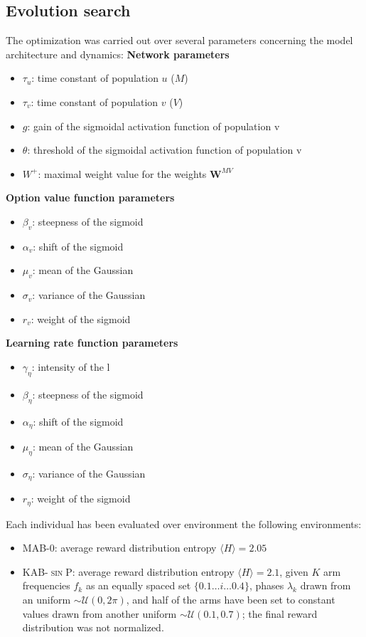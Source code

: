 \subsection{Evolution search}
The optimization was carried out over several parameters concerning the model architecture and dynamics:
\textbf{Network parameters}
\begin{itemize}
    \item $\tau_{u}$: time constant of population $u$ ($M$)
    \item $\tau_{v}$: time constant of population $v$ ($V$)
    \item $g$: gain of the sigmoidal activation function of population v
    \item $\theta$: threshold of the sigmoidal activation function of population v
    \item $W^{+}$: maximal weight value for the weights $\textbf{W}^{MV}$
\end{itemize}

\noindent \textbf{Option value function parameters}
\begin{itemize}
    \item $\beta_{v}$: steepness of the sigmoid
    \item $\alpha_{v}$: shift of the sigmoid
    \item $\mu_{v}$: mean of the Gaussian
    \item $\sigma_{v}$: variance of the Gaussian
    \item $r_{v}$: weight of the sigmoid
\end{itemize}

\noindent \textbf{Learning rate function parameters}
\begin{itemize}
    \item $\gamma_{\eta}$: intensity of the l
    \item $\beta_{\eta}$: steepness of the sigmoid
    \item $\alpha_{\eta}$: shift of the sigmoid
    \item $\mu_{\eta}$: mean of the Gaussian
    \item $\sigma_{\eta}$: variance of the Gaussian
    \item $r_{\eta}$: weight of the sigmoid
\end{itemize}

\noindent Each individual has been evaluated over environment the following environments:

\begin{itemize}
    \item \textsc{MAB-0}: average reward distribution entropy $\langle H\rangle=2.05$
    \item \textsc{KAB-$\sin$P}: average reward distribution entropy $\langle H\rangle=2.1$, given $K$ arm frequencies $f_{k}$ as an equally spaced set $\{0.1\ldots i\ldots 0.4\}$, phases $\lambda_{k}$ drawn from an uniform $\sim \mathcal{U}(0, 2\pi)$, and half of the arms have been set to constant values drawn from
        another uniform $\sim \mathcal{U}(0.1, 0.7)$; the final reward distribution was not normalized.
\end{itemize}

